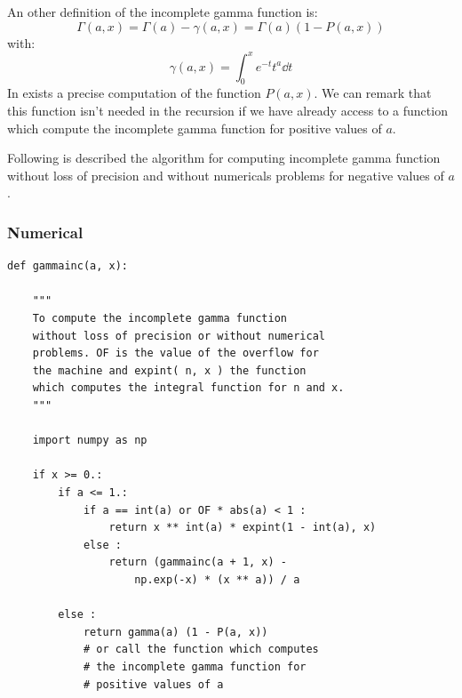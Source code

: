 An other definition of the incomplete gamma function is:
%
\begin{equation}
    \Gamma\left({a,x}\right)=\Gamma\left({a}\right)-\gamma\left({a,x}\right)=\Gamma\left({a}\right)\left({1-P\left({a,x}\right)}\right)
\end{equation}
%
with:
%
\begin{equation}
    \gamma\left({a,x}\right)=\int_0^x{e^{-t}{t^{a}}\dd{t}}
\end{equation}
%
In \citet{NumericalRecipes} exists a precise computation of the function
$P\left({a,x}\right)$. We can remark that this function isn't needed in the recursion
if we have already access to a function which compute the incomplete gamma
function for positive values of $a$.

Following is described the algorithm for computing incomplete gamma function
without loss of precision and without numericals problems for negative values
of $a$.
%
\subsubsection{Numerical}
%
\begin{verbatim}
def gammainc(a, x):

    """
    To compute the incomplete gamma function
    without loss of precision or without numerical
    problems. OF is the value of the overflow for
    the machine and expint( n, x ) the function
    which computes the integral function for n and x.
    """

    import numpy as np

    if x >= 0.:
        if a <= 1.:
            if a == int(a) or OF * abs(a) < 1 :
                return x ** int(a) * expint(1 - int(a), x)
            else :
                return (gammainc(a + 1, x) -
                    np.exp(-x) * (x ** a)) / a

        else :
            return gamma(a) (1 - P(a, x))
            # or call the function which computes
            # the incomplete gamma function for
            # positive values of a
\end{verbatim}
